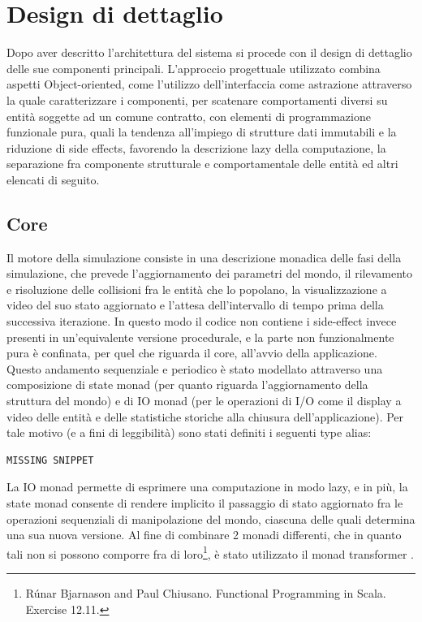 \chapter{Design di dettaglio}

Dopo aver descritto l’architettura del sistema si procede con il design di dettaglio delle sue componenti principali. 
L’approccio progettuale utilizzato combina aspetti Object-oriented, come l’utilizzo dell’interfaccia come astrazione attraverso la quale caratterizzare i componenti, per scatenare comportamenti diversi su entità soggette ad un comune contratto, con elementi di programmazione funzionale pura, quali la tendenza all’impiego di strutture dati immutabili e la riduzione di side effects, favorendo la descrizione lazy della computazione, la separazione fra componente strutturale e comportamentale delle entità ed altri elencati di seguito.


\section{Core}
Il motore della simulazione  consiste in una descrizione monadica delle fasi della simulazione, che prevede l’aggiornamento dei parametri del mondo, il rilevamento e risoluzione delle collisioni fra le entità che lo popolano, la visualizzazione a video del suo stato aggiornato e l’attesa dell’intervallo di tempo prima della successiva iterazione. In questo modo il codice non contiene i side-effect invece presenti in un’equivalente versione procedurale, e la parte non funzionalmente pura è confinata, per quel che riguarda il core, all’avvio della applicazione. 
Questo andamento sequenziale e periodico è stato modellato attraverso una composizione di state monad  (per quanto riguarda l’aggiornamento della struttura del mondo) e di IO monad (per le operazioni di I/O come il display a video delle entità e delle statistiche storiche alla chiusura dell’applicazione). Per tale motivo (e a fini di leggibilità) sono stati definiti i seguenti type alias:



\begin{verbatim}
MISSING SNIPPET
\end{verbatim}

La IO monad permette di esprimere una computazione in modo lazy, e in più, la state monad consente di rendere implicito il passaggio di stato aggiornato fra le operazioni sequenziali di manipolazione del mondo, ciascuna delle quali determina una sua nuova versione. Al fine di combinare 2 monadi differenti, che in quanto tali non si possono comporre fra di loro\footnote{Rúnar Bjarnason and Paul Chiusano. Functional Programming in Scala. Exercise 12.11.}, è stato utilizzato il monad transformer .

